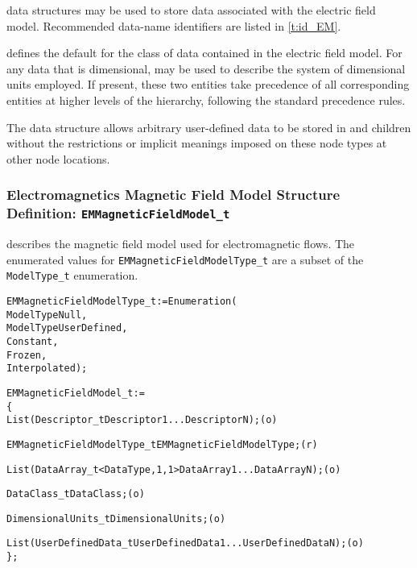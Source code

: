  data structures may be used to store data associated
with the electric field model.
Recommended data-name identifiers are listed in \autoref{t:id_EM}.

 defines the default for the class of data contained in
the electric field model.
For any data that is dimensional,  may be used to
describe the system of dimensional units employed.
If present, these two entities take precedence of all corresponding
entities at higher levels of the hierarchy, following the standard
precedence rules.

The  data structure allows arbitrary
user-defined data to be stored in  and
 children without the restrictions or implicit
meanings imposed on these node types at other node locations.

\subsubsection{Electromagnetics Magnetic Field Model Structure Definition: \texttt{EMMagneticFieldModel\_t}}

 describes the magnetic field model used
for electromagnetic flows.
The enumerated values for \texttt{EMMagneticFieldModelType\_t} are a subset of the
\texttt{ModelType\_t} enumeration.
\begin{alltt}
  EMMagneticFieldModelType\_t := Enumeration(
    ModelTypeNull,
    ModelTypeUserDefined,
    Constant,
    Frozen,
    Interpolated ) ;
\end{alltt}

\begin{alltt}
  EMMagneticFieldModel\_t :=
    \{
    List( Descriptor\_t Descriptor1 ... DescriptorN ) ;                      (o)

    EMMagneticFieldModelType\_t EMMagneticFieldModelType ;                   (r)
    
    List( DataArray\_t<DataType, 1, 1> DataArray1 ... DataArrayN ) ;         (o)

    DataClass\_t DataClass ;                                                 (o)
                
    DimensionalUnits\_t DimensionalUnits ;                                   (o)

    List( UserDefinedData\_t UserDefinedData1 ... UserDefinedDataN ) ;       (o)
    \} ;
\end{alltt}


